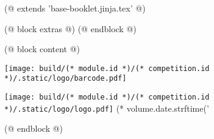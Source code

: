 (@ extends 'base-booklet.jinja.tex' @)

(@ block extras @)
(@ endblock @)

(@ block content @)
    \pagestyle{empty}
    \begin{center}
        \null
        \vfill
        \texttt{[image: build/(* module.id *)/(* competition.id *)/.static/logo/barcode.pdf]}
    \end{center}
    \newpage
    \begin{center}
        \vspace*{20mm}
        \texttt{[image: build/(* module.id *)/(* competition.id *)/.static/logo/logo.pdf]}
        \vfill
        \fontsize{60}{25}\selectfont
        (* volume.date.strftime('%
    \end{center}
(@ endblock @)

